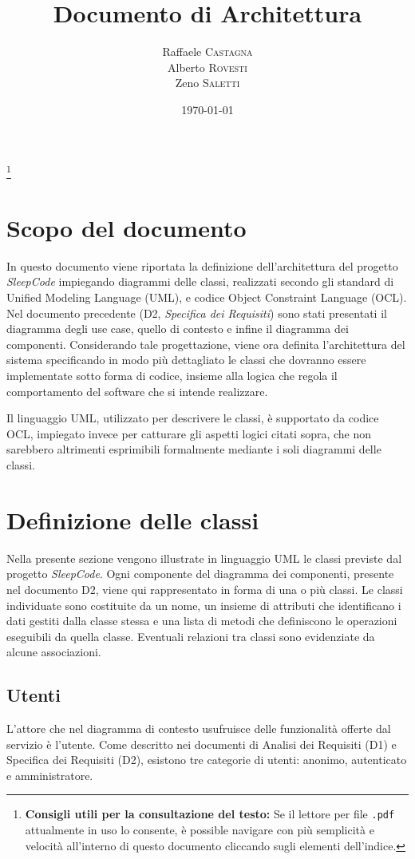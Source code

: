\documentclass[11pt, a4paper]{article}
\title{Documento di Architettura}
\author{Raffaele \textsc{Castagna}\\
Alberto \textsc{Rovesti}\\
Zeno \textsc{Saletti}}
\date{\today}
\theoremstyle{definition} %
\newcommand\blfootnote[1]{%
  \begingroup
  \renewcommand\thefootnote{}\footnote{#1}%
  \addtocounter{footnote}{-1}%
  \endgroup
}
\begin{document}


\tableofcontents\blfootnote{\textbf{Consigli utili per la consultazione del testo:} Se il lettore per file \texttt{.pdf} attualmente in uso lo consente, è possible navigare con più semplicità e velocità all'interno di questo documento cliccando sugli elementi dell'indice.}

\newpage

\section*{Scopo del documento}
In questo documento viene riportata la definizione dell'architettura del
progetto \textit{SleepCode} impiegando diagrammi delle classi, realizzati
secondo gli standard di Unified Modeling Language (UML), e codice Object
Constraint Language (OCL). Nel documento precedente (D2, \textit{Specifica
dei Requisiti}) sono stati presentati il diagramma degli use case, quello
di contesto e infine il diagramma dei componenti. Considerando tale
progettazione, viene ora definita l'architettura del sistema specificando
in modo più dettagliato le classi che dovranno essere implementate sotto forma di
codice, insieme alla logica che regola il comportamento del software che
si intende realizzare.

Il linguaggio UML, utilizzato per descrivere le classi, è supportato da
codice OCL, impiegato invece per catturare gli aspetti logici citati sopra,
che non sarebbero altrimenti esprimibili formalmente mediante i soli diagrammi delle
classi.


\newpage
\section{Definizione delle classi}
Nella presente sezione vengono illustrate in linguaggio UML le classi
previste dal progetto \textit{SleepCode}. Ogni componente del diagramma
dei componenti, presente nel documento D2, viene qui rappresentato
in forma di una o più classi. Le classi individuate sono costituite
da un nome, un insieme di attributi che identificano i dati gestiti dalla
classe stessa e una lista di metodi che definiscono le operazioni
eseguibili da quella classe. Eventuali relazioni tra classi sono evidenziate
da alcune associazioni.

\subsection{Utenti}
L'attore che nel diagramma di contesto usufruisce delle funzionalità offerte
dal servizio è l'utente. Come descritto nei documenti di Analisi dei Requisiti (D1)
e Specifica dei Requisiti (D2), esistono tre categorie di utenti: anonimo, autenticato
e amministratore.
\end{document}
